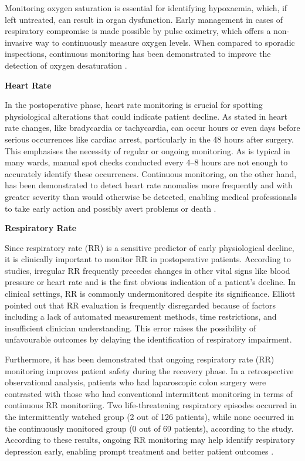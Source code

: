 Monitoring oxygen saturation is essential for identifying hypoxaemia, which, if left untreated, can result in organ dysfunction. Early management in cases of respiratory compromise is made possible by pulse oximetry, which offers a non-invasive way to continuously measure oxygen levels. When compared to sporadic inspections, continuous monitoring has been demonstrated to improve the detection of oxygen desaturation \cite{Khanna2024_fz}.

\textbf{Heart Rate}

In the postoperative phase, heart rate monitoring is crucial for spotting physiological alterations that could indicate patient decline. As stated in \cite{Khanna2025_sg} heart rate changes, like bradycardia or tachycardia, can occur hours or even days before serious occurrences like cardiac arrest, particularly in the 48 hours after surgery. This emphasises the necessity of regular or ongoing monitoring. As is typical in many wards, manual spot checks conducted every 4–8 hours are not enough to accurately identify these occurrences. Continuous monitoring, on the other hand, has been demonstrated to detect heart rate anomalies more frequently and with greater severity than would otherwise be detected, enabling medical professionals to take early action and possibly avert problems or death \cite{Khanna2025_sg}.

\textbf{Respiratory Rate}

Since respiratory rate (RR) is a sensitive predictor of early physiological decline, it is clinically important to monitor RR in postoperative patients. According to studies, irregular RR frequently precedes changes in other vital signs like blood pressure or heart rate and is the first obvious indication of a patient's decline. In clinical settings, RR is commonly undermonitored despite its significance. Elliott \cite{Elliot2016Respiratory} pointed out that RR evaluation is frequently disregarded because of factors including a lack of automated measurement methods, time restrictions, and insufficient clinician understanding. This error raises the possibility of unfavourable outcomes by delaying the identification of respiratory impairment.

Furthermore, it has been demonstrated that ongoing respiratory rate (RR) monitoring improves patient safety during the recovery phase. In a retrospective observational analysis, patients who had laparoscopic colon surgery were contrasted with those who had conventional intermittent monitoring in terms of continuous RR monitoriing. Two life-threatening respiratory episodes occurred in the intermittently watched group (2 out of 126 patients), while none occurred in the continuously monitored group (0 out of 69 patients), according to the study. According to these results, ongoing RR monitoring may help identify respiratory depression early, enabling prompt treatment and better patient outcomes \cite{Kawanishi2017Incidence}.

